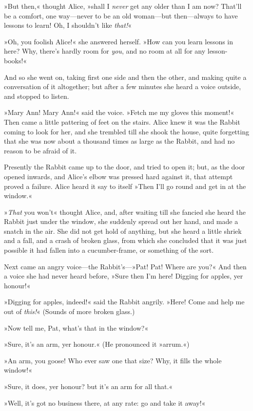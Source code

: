 »But then,« thought Alice, »shall I \textit{never} get any older than I am now? That'll be a comfort, one way—never to be an old woman—but then—always to have lessons to learn! Oh, I shouldn't like \textit{that!}«

»Oh, you foolish Alice!« she answered herself. »How can you learn lessons in here? Why, there's hardly room for \textit{you}, and no room at all for any lesson-books!«

And so she went on, taking first one side and then the other, and making quite a conversation of it altogether; but after a few minutes she heard a voice outside, and stopped to listen.

»Mary Ann! Mary Ann!« said the voice. »Fetch me my gloves this moment!« Then came a little pattering of feet on the stairs. Alice knew it was the Rabbit coming to look for her, and she trembled till she shook the house, quite forgetting that she was now about a thousand times as large as the Rabbit, and had no reason to be afraid of it.

Presently the Rabbit came up to the door, and tried to open it; but, as the door opened inwards, and Alice's elbow was pressed hard against it, that attempt proved a failure. Alice heard it say to itself »Then I'll go round and get in at the window.«

»\textit{That} you won't« thought Alice, and, after waiting till she fancied she heard the Rabbit just under the window, she suddenly spread out her hand, and made a snatch in the air. She did not get hold of anything, but she heard a little shriek and a fall, and a crash of broken glass, from which she concluded that it was just possible it had fallen into a cucumber-frame, or something of the sort.

Next came an angry voice—the Rabbit's—»Pat! Pat! Where are you?« And then a voice she had never heard before, »Sure then I'm here! Digging for apples, yer honour!«

»Digging for apples, indeed!« said the Rabbit angrily. »Here! Come and help me out of \textit{this!}« (Sounds of more broken glass.)

»Now tell me, Pat, what's that in the window?«

»Sure, it's an arm, yer honour.« (He pronounced it »arrum.«)

»An arm, you goose! Who ever saw one that size? Why, it fills the whole window!«

»Sure, it does, yer honour? but it's an arm for all that.«

»Well, it's got no business there, at any rate: go and take it away!«

